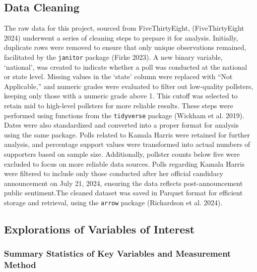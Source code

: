 \documentclass[
  letterpaper,
  DIV=11,
  numbers=noendperiod]{scrartcl}
\begin{document}
\hypertarget{data-cleaning}{%
\subsection{Data Cleaning}\label{data-cleaning}}

The raw data for this project, sourced from FiveThirtyEight,
(FiveThirtyEight 2024) underwent a series of cleaning steps to prepare
it for analysis. Initially, duplicate rows were removed to ensure that
only unique observations remained, facilitated by the \texttt{janitor}
package (Firke 2023). A new binary variable, `national', was created to
indicate whether a poll was conducted at the national or state level.
Missing values in the `state' column were replaced with ``Not
Applicable,'' and numeric grades were evaluated to filter out
low-quality pollsters, keeping only those with a numeric grade above 1.
This cutoff was selected to retain mid to high-level pollsters for more
reliable results. These steps were performed using functions from the
\texttt{tidyverse} package (Wickham et al. 2019). Dates were also
standardized and converted into a proper format for analysis using the
same package. Polls related to Kamala Harris were retained for further
analysis, and percentage support values were transformed into actual
numbers of supporters based on sample size. Additionally, pollster
counts below five were excluded to focus on more reliable data sources.
Polls regarding Kamala Harris were filtered to include only those
conducted after her official candidacy announcement on July 21, 2024,
ensuring the data reflects post-announcement public sentiment.The
cleaned dataset was saved in Parquet format for efficient storage and
retrieval, using the \texttt{arrow} package (Richardson et al. 2024).

\hypertarget{explorations-of-variables-of-interest}{%
\subsection{Explorations of Variables of
Interest}\label{explorations-of-variables-of-interest}}

\hypertarget{summary-statistics-of-key-variables-and-measurement-method}{%
\subsubsection{Summary Statistics of Key Variables and Measurement
Method}\label{summary-statistics-of-key-variables-and-measurement-method}}
\end{document}
